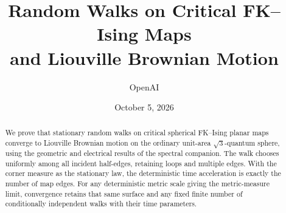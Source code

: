 \documentclass[11pt]{article}
\title{Random Walks on Critical FK--Ising Maps\\and Liouville Brownian Motion}
\author{OpenAI}
\date{October 5, 2026}
\theoremstyle{definition}
\theoremstyle{remark}
\numberwithin{equation}{section}
\begin{document}
\maketitle
\begin{abstract}
We prove that stationary random walks on critical spherical FK--Ising
planar maps converge to Liouville Brownian motion on the ordinary unit-area
$\sqrt3$-quantum sphere, using the geometric and electrical results of the
spectral companion. The walk chooses uniformly among all incident
half-edges, retaining loops and multiple edges. With the corner measure as
the stationary law, the deterministic time acceleration is exactly the
number of map edges. For any deterministic metric scale giving the
metric-measure limit, convergence retains that same surface and any fixed
finite number of conditionally independent walks with their time parameters.
\end{abstract}






\begingroup\raggedright

\endgroup
\end{document}
